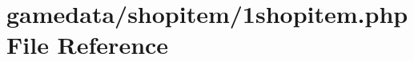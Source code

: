 \hypertarget{1shopitem_8php}{\section{gamedata/shopitem/1shopitem.php File Reference}
\label{1shopitem_8php}
}
